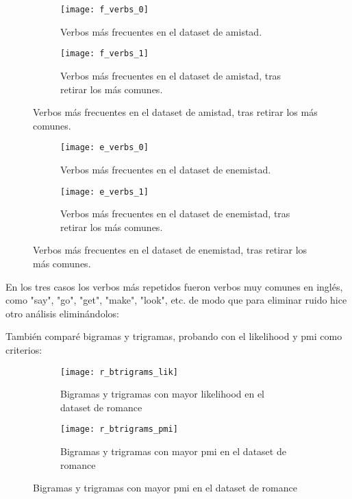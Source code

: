 \documentclass{pre-tfg}
\begin{document}
\begin{figure}
	\centering
	\begin{subfigure}{\textwidth}
		\texttt{[image: f\_verbs\_0]}
		\caption{Verbos más frecuentes en el dataset de amistad.}
		\label{fig:f_verb_freq_in_dataset}
		
	\end{subfigure}
	\begin{subfigure}{\textwidth}
		\texttt{[image: f\_verbs\_1]}
		\caption{Verbos más frecuentes en el dataset de amistad, tras retirar los más comunes.}
		\label{fig:f_verb_freq_removed}
	\end{subfigure}
	
	
\end{figure}


\begin{figure}
	\centering
	\begin{subfigure}{\textwidth}
		\texttt{[image: e\_verbs\_0]}
		\caption{Verbos más frecuentes en el dataset de enemistad.}
		\label{fig:e_verb_freq_in_dataset}
		
	\end{subfigure}
	\begin{subfigure}{\textwidth}
		\texttt{[image: e\_verbs\_1]}
		\caption{Verbos más frecuentes en el dataset de enemistad, tras retirar los más comunes.}
		\label{fig:e_verb_freq_removed}
	\end{subfigure}
	
	
\end{figure}

En los tres casos los verbos más repetidos fueron verbos muy comunes en inglés, como "say", "go", "get", "make", "look", etc. de modo que para eliminar ruido hice otro análisis eliminándolos:

También comparé bigramas y trigramas, probando con el likelihood y pmi como criterios:

\begin{figure}
	\centering
	\begin{subfigure}{\textwidth}
		\texttt{[image: r\_btrigrams\_lik]}
		\caption{Bigramas y trigramas con mayor likelihood en el dataset de romance}
		\label{fig:r_btrigram_lik}
		
	\end{subfigure}
	\begin{subfigure}{\textwidth}
		\texttt{[image: r\_btrigrams\_pmi]}
		\caption{Bigramas y trigramas con mayor pmi en el dataset de romance}
		\label{fig:r_btrigram_pmi}
	\end{subfigure}
	
	
\end{figure}
\end{document}
